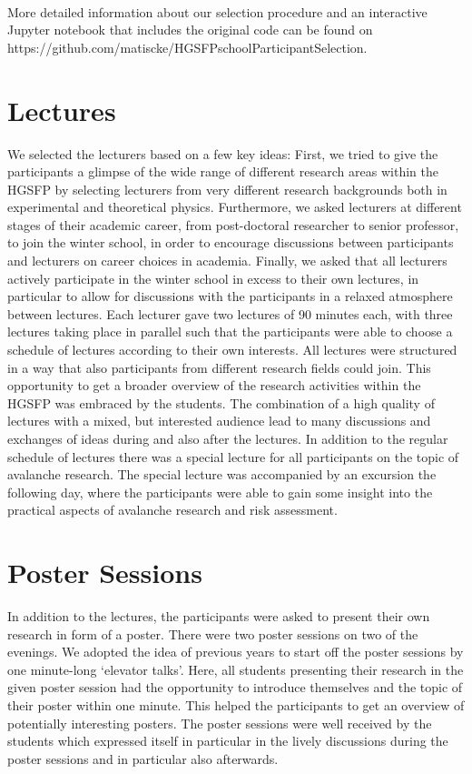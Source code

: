~\\
More detailed information about our selection procedure and an interactive Jupyter notebook that includes the original code can be found on\\
https://github.com/matiscke/HGSFPschoolParticipantSelection.








\section*{Lectures}
We selected the lecturers based on a few key ideas: First, we tried to give the participants a glimpse of the wide range of different research areas within the HGSFP by selecting lecturers from very different research backgrounds both in experimental and theoretical physics. Furthermore, we asked lecturers at different stages of their academic career, from post-doctoral researcher to senior professor, to join the winter school, in order to encourage discussions between participants and lecturers on career choices in academia. Finally, we asked that all lecturers actively participate in the winter school in excess to their own lectures, in particular to allow for discussions with the participants in a relaxed atmosphere between lectures.
Each lecturer gave two lectures of 90 minutes each, with three lectures taking place in parallel such that the participants were able to choose a schedule of lectures according to their own interests. All lectures were structured in a way that also participants from different research fields could join. This opportunity to get a broader overview of the research activities within the HGSFP was embraced by the students. The combination of a high quality of lectures with a mixed, but interested audience lead to many discussions and exchanges of ideas during and also after the lectures.
In addition to the regular schedule of lectures there was a special lecture for all participants on the topic of avalanche research. The special lecture was accompanied by an excursion the following day, where the participants were able to gain some insight into the practical aspects of avalanche research and risk assessment.

\section*{Poster Sessions}
In addition to the lectures, the participants were asked to present their own research in form of a poster. There were two poster sessions on two of the evenings. We adopted the idea of previous years to start off the poster sessions by one minute-long ‘elevator talks’. Here, all students presenting their research in the given poster session had the opportunity to introduce themselves and the topic of their poster within one minute. This helped the participants to get an overview of potentially interesting posters. The poster sessions were well received by the students which expressed itself in particular in the lively discussions during the poster sessions and in particular also afterwards.

